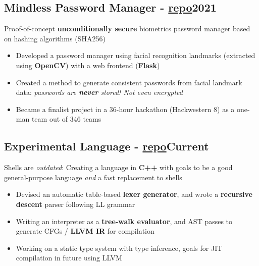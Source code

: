 \documentclass[9pt]{article}
\begin{document}
\subsection{Mindless Password Manager \normalsize\textnormal{- \href{https://github.com/ianayl/mindless}{repo}}\hfill \normalsize\textnormal{2021}}
    Proof-of-concept \textbf{unconditionally secure} biometrics password manager based on hashing algorithms (SHA256)
    \vspace{-0.5em}
\begin{itemize}
  \item Developed a password manager using facial recognition landmarks (extracted using \textbf{OpenCV}) with a web frontend (\textbf{Flask})
  \item Created a method to generate consistent passwords from facial landmark data: \textit{passwords are \textbf{never} stored! Not even encrypted}
    \item Became a finalist project in a 36-hour hackathon (Hackwestern 8) as a one-man team out of 346 teams
\end{itemize}

\subsection{Experimental Language \normalsize\textnormal{- \href{https://github.com/ianayl/compiler}{repo}}\hfill \normalsize\textnormal{Current}}
Shells are \textit{outdated}: Creating a language in \textbf{C++} with goals to be a good general-purpose language \textit{and} a fast replacement to shells
\vspace{-0.5em}
\begin{itemize}
  \item Devised an automatic table-based \textbf{lexer generator}, and wrote a \textbf{recursive descent} parser following LL grammar
  \item Writing an interpreter as a \textbf{tree-walk evaluator}, and AST passes to generate CFGs / \textbf{LLVM IR} for compilation
  \item Working on a static type system with type inference, goals for JIT compilation in future using LLVM
\end{itemize}
\end{document}
